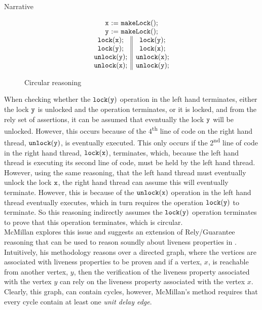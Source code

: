 \documentclass{article}
\begin{document}
\begin{section}{Narrative}
  \begin{figure}
    \[
    \begin{array}{c}
      \mathtt{x} \mathtt{\ :=\ } \mathtt{makeLock}(); \\
      \mathtt{y} \mathtt{\ :=\ } \mathtt{makeLock}(); \\
      \begin{array}{c || c}
        \mathtt{lock}(\mathtt{x}); & \mathtt{lock}(\mathtt{y}); \\
        \mathtt{lock}(\mathtt{y}); & \mathtt{lock}(\mathtt{x}); \\
        \mathtt{unlock}(\mathtt{y}); & \mathtt{unlock}(\mathtt{x}); \\
        \mathtt{unlock}(\mathtt{x}); & \mathtt{unlock}(\mathtt{y});
      \end{array}
    \end{array}
    \]
    \caption{Circular reasoning}
    \label{NaiveTotalRGCircular}
  \end{figure}

  When checking whether the $\mathtt{lock}(\mathtt{y})$ operation in the left hand terminates, either the lock $\mathtt{y}$ is unlocked and the operation terminates, or it is locked, and from the rely set of assertions, it can be assumed that eventually the lock $\mathtt{y}$ will be unlocked. However, this occurs because of the 4\textsuperscript{th} line of code on the right hand thread, $\mathtt{unlock}(\mathtt{y})$, is eventually executed. This only occurs if the 2\textsuperscript{nd} line of code in the right hand thread, $\mathtt{lock}(\mathtt{x})$, terminates, which, because the left hand thread is executing its second line of code, must be held by the left hand thread. However, using the same reasoning, that the left hand thread must eventually unlock the lock $\mathtt{x}$, the right hand thread can assume this will eventually terminate. However, this is because of the $\mathtt{unlock}(\mathtt{x})$ operation in the left hand thread eventually executes, which in turn requires the operation $\mathtt{lock}(\mathtt{y})$ to terminate. So this reasoning indirectly assumes the $\mathtt{lock}(\mathtt{y})$ operation terminates to prove that this operation terminates, which is circular. \\

  McMillan explores this issue and suggests an extension of Rely/Guarantee reasoning that can be used to reason soundly about liveness properties in \cite{McMillan}. Intuitively, his methodology reasons over a directed graph, where the vertices are associated with liveness properties to be proven and if a vertex, $x$, is reachable from another vertex, $y$, then the verification of the liveness property associated with the vertex $y$ can rely on the liveness property associated with the vertex $x$. Clearly, this graph, can contain cycles, however, McMillan's method requires that every cycle contain at least one \emph{unit delay edge}.\\


\end{section}
\end{document}
